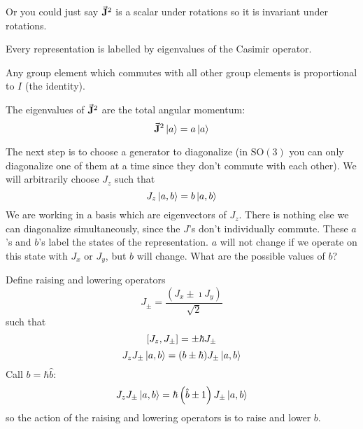 \documentclass[a4paper,twoside,master.tex]{subfiles}
\begin{document}
Or you could just say $\va{ J}^2 $ is a scalar under rotations so it is invariant under rotations.

Every representation is labelled by eigenvalues of the Casimir operator.
\begin{lemma}
    Any group element which commutes with all other group elements is proportional to $ I $ (the identity).
\end{lemma}

The eigenvalues of $\va{ J}^2 $ are the total angular momentum:
\begin{equation}
    \va{ J}^2\ket{a} = a\ket{a}
\end{equation}

The next step is to choose a generator to diagonalize (in $ \text{SO}(3) $ you can only diagonalize one of them at a time since they don't commute with each other). We will arbitrarily choose $ J_z $ such that
\begin{equation}
    J_z\ket{a,b} = b\ket{a,b}
\end{equation}
We are working in a basis which are eigenvectors of $ J_z $. There is nothing else we can diagonalize simultaneously, since the $ J $'s don't individually commute. These $ a $'s and $ b $'s label the states of the representation. $ a $ will not change if we operate on this state with $ J_x $ or $ J_y $, but $ b $ will change. What are the possible values of $ b $?

Define raising and lowering operators
\begin{equation}
    J_{\pm} = \frac{(J_x \pm \imath J_y)}{\sqrt{2}}
\end{equation}
such that
\begin{equation}
    \comm{J_z}{J_{\pm}} = \pm \hbar J_{\pm}
\end{equation}
\begin{equation}
    J_z J_{\pm}\ket{a,b} = (b \pm \hbar) J_{\pm}\ket{a,b}
\end{equation}
Call $ b = \hbar\hat{ b} $:
\begin{equation}
    J_z J_{\pm}\ket{a,b} = \hbar \left(\hat{ b} \pm 1 \right) J_{\pm}\ket{a,b}
\end{equation}
so the action of the raising and lowering operators is to raise and lower $ b $.
\end{document}
